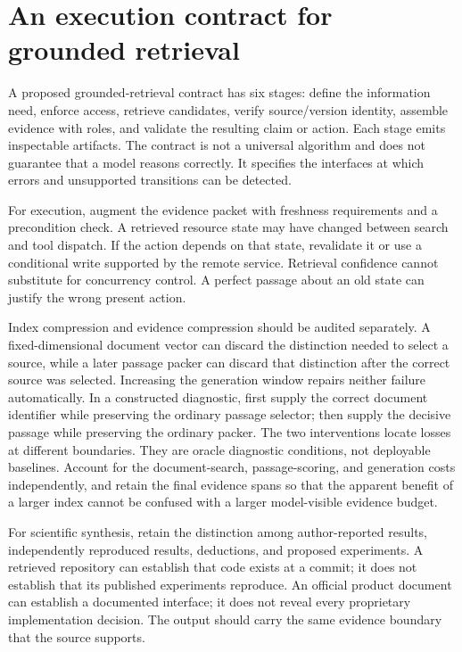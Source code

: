 \section{An execution contract for grounded retrieval}\label{sec:C16:contract}
A proposed grounded-retrieval contract has six stages: define the information need, enforce access, retrieve candidates, verify source/version identity, assemble evidence with roles, and validate the resulting claim or action. Each stage emits inspectable artifacts. The contract is not a universal algorithm and does not guarantee that a model reasons correctly. It specifies the interfaces at which errors and unsupported transitions can be detected.

For execution, augment the evidence packet with freshness requirements and a precondition check. A retrieved resource state may have changed between search and tool dispatch. If the action depends on that state, revalidate it or use a conditional write supported by the remote service. Retrieval confidence cannot substitute for concurrency control. A perfect passage about an old state can justify the wrong present action.

Index compression and evidence compression should be audited separately. A fixed-dimensional document vector can discard the distinction needed to select a source, while a later passage packer can discard that distinction after the correct source was selected. Increasing the generation window repairs neither failure automatically. In a constructed diagnostic, first supply the correct document identifier while preserving the ordinary passage selector; then supply the decisive passage while preserving the ordinary packer. The two interventions locate losses at different boundaries. They are oracle diagnostic conditions, not deployable baselines. Account for the document-search, passage-scoring, and generation costs independently, and retain the final evidence spans so that the apparent benefit of a larger index cannot be confused with a larger model-visible evidence budget.

For scientific synthesis, retain the distinction among author-reported results, independently reproduced results, deductions, and proposed experiments. A retrieved repository can establish that code exists at a commit; it does not establish that its published experiments reproduce. An official product document can establish a documented interface; it does not reveal every proprietary implementation decision. The output should carry the same evidence boundary that the source supports.


